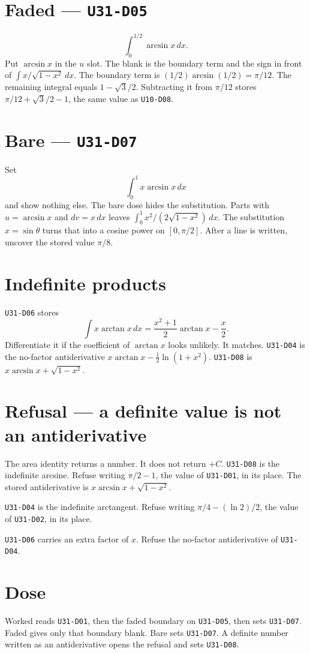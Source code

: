\section{Faded --- \texttt{U31-D05}}
\[
\int_0^{1/2}\arcsin x\,dx.
\]
Put $\arcsin x$ in the $u$ slot. The blank is the boundary term and the sign in front of $\int x/\sqrt{1-x^2}\,dx$. The boundary term is $(1/2)\arcsin(1/2)=\pi/12$. The remaining integral equals $1-\sqrt{3}/2$. Subtracting it from $\pi/12$ stores $\pi/12+\sqrt{3}/2-1$, the same value as \texttt{U10-D08}.

\section{Bare --- \texttt{U31-D07}}
Set
\[
\int_0^1 x\arcsin x\,dx
\]
and show nothing else. The bare dose hides the substitution. Parts with $u=\arcsin x$ and $dv=x\,dx$ leaves $\int_0^1 x^2/(2\sqrt{1-x^2})\,dx$. The substitution $x=\sin\theta$ turns that into a cosine power on $[0,\pi/2]$. After a line is written, uncover the stored value $\pi/8$.

\section{Indefinite products}
\texttt{U31-D06} stores
\[
\int x\arctan x\,dx=\frac{x^2+1}{2}\arctan x-\frac x2.
\]
Differentiate it if the coefficient of $\arctan x$ looks unlikely. It matches. \texttt{U31-D04} is the no-factor antiderivative $x\arctan x-\frac12\ln(1+x^2)$. \texttt{U31-D08} is $x\arcsin x+\sqrt{1-x^2}$.

\section{Refusal --- a definite value is not an antiderivative}
The area identity returns a number. It does not return $+C$. \texttt{U31-D08} is the indefinite arcsine. Refuse writing $\pi/2-1$, the value of \texttt{U31-D01}, in its place. The stored antiderivative is $x\arcsin x+\sqrt{1-x^2}$.

\texttt{U31-D04} is the indefinite arctangent. Refuse writing $\pi/4-(\ln 2)/2$, the value of \texttt{U31-D02}, in its place.

\texttt{U31-D06} carries an extra factor of $x$. Refuse the no-factor antiderivative of \texttt{U31-D04}.

\section{Dose}
Worked reads \texttt{U31-D01}, then the faded boundary on \texttt{U31-D05}, then sets \texttt{U31-D07}. Faded gives only that boundary blank. Bare sets \texttt{U31-D07}. A definite number written as an antiderivative opens the refusal and sets \texttt{U31-D08}.

